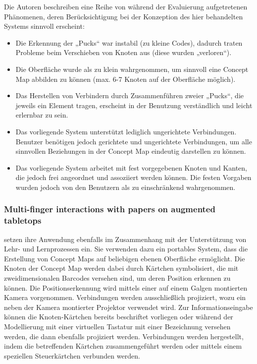 Die Autoren beschreiben eine Reihe von während der Evaluierung aufgetretenen Phänomenen, deren Berücksichtigung bei der Konzeption des hier behandelten Systems sinnvoll erscheint:
\begin{itemize}
	\item Die Erkennung der „Pucks“ war instabil (zu kleine Codes), dadurch traten Probleme beim Verschieben von Knoten aus (diese wurden „verloren“).
	\item Die Oberfläche wurde als zu klein wahrgenommen, um sinnvoll eine Concept Map abbilden zu können (max. 6-7 Knoten auf der Oberfläche möglich).
	\item Das Herstellen von Verbindern durch Zusammenführen zweier „Pucks“, die jeweils ein Element tragen, erscheint in der Benutzung verständlich und leicht erlernbar zu sein.
	\item Das vorliegende System unterstützt lediglich ungerichtete Verbindungen. Benutzer benötigen jedoch gerichtete und ungerichtete Verbindungen, um alle sinnvollen Beziehungen in der Concept Map eindeutig darstellen zu können.
	\item Das vorliegende System arbeitet mit fest vorgegebenen Knoten und Kanten, die jedoch frei angeordnet und assoziiert werden können. Die festen Vorgaben wurden jedoch von den Benutzern als zu einschränkend wahrgenommen.
\end{itemize}


\subsubsection{Multi-finger interactions with papers on augmented tabletops} %
\label{ssub:multi_finger_interactions_with_papers_on_augmented_tabletops}

\citet{Do-Lenh09} setzen ihre Anwendung ebenfalls im Zusammenhang mit der Unterstützung von Lehr- und Lernprozessen ein. Sie verwenden dazu ein portables System, dass die Erstellung von Concept Maps auf beliebigen ebenen Oberfläche ermöglicht. Die Knoten der Concept Map werden dabei durch Kärtchen symbolisiert, die mit zweidimensionalen Barcodes versehen sind, um deren Position erkennen zu können. Die Positionserkennung wird mittels einer auf einem Galgen montierten Kamera vorgenommen. Verbindungen werden ausschließlich projiziert, wozu ein neben der Kamera montierter Projektor verwendet wird. Zur Informationseingabe können die Knoten-Kärtchen bereits beschriftet vorliegen oder während der Modellierung mit einer virtuellen Tastatur mit einer Bezeichnung versehen werden, die dann ebenfalls projiziert werden. Verbindungen werden hergestellt, indem die betreffenden Kärtchen zusammengeführt werden oder mittels einem speziellen Steuerkärtchen verbunden werden. 


